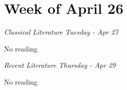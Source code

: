 \documentclass[12pt, notitlepage]{article}   	%
\begin{document}
{\section*{Week of April 26}
\textit{Classical Literature Tuesday - Apr 27} \par
No reading \par

\textit{Recent Literature Thursday - Apr 29} \par
No reading \par

} %
\end{document}
